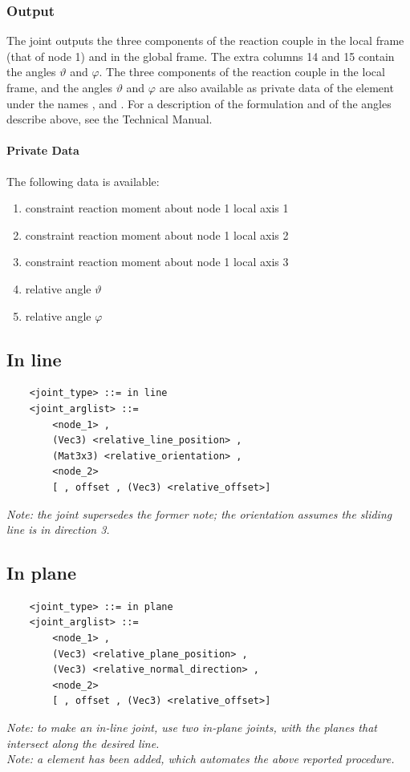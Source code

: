 \subsubsection{Output}
The  joint outputs the three components
of the reaction couple in the local frame (that of node 1) 
and in the global frame.
The extra columns 14 and 15 contain the angles $\vartheta$ and $\varphi$.
The three components of the reaction couple in the local frame, 
and the angles $\vartheta$ and $\varphi$ are also available
as private data of the element under the names ,
 and .
For a description of the formulation and of the angles describe above,
see the Technical Manual.

\paragraph{Private Data}
The following data is available:
\begin{enumerate}
\item {} constraint reaction moment about node 1 local axis 1
\item {} constraint reaction moment about node 1 local axis 2
\item {} constraint reaction moment about node 1 local axis 3
\item {} relative angle $\vartheta$
\item {} relative angle $\varphi$
\end{enumerate}



\subsection{In line}
\begin{verbatim}
    <joint_type> ::= in line
    <joint_arglist> ::= 
        <node_1> , 
        (Vec3) <relative_line_position> ,
        (Mat3x3) <relative_orientation> ,
        <node_2>
        [ , offset , (Vec3) <relative_offset>]
\end{verbatim}
{\em 
    Note: the  joint supersedes the former note; the orientation
    assumes the sliding line is in direction 3.
}

\subsection{In plane}
\begin{verbatim}
    <joint_type> ::= in plane
    <joint_arglist> ::= 
        <node_1> , 
        (Vec3) <relative_plane_position> ,
        (Vec3) <relative_normal_direction> ,
        <node_2>
        [ , offset , (Vec3) <relative_offset>]
\end{verbatim}
{\em
    Note: to make an in-line joint, use two in-plane joints, with the
    planes that intersect along the desired line. \\
    Note: a  element has been added, which automates the above
    reported procedure.
}

